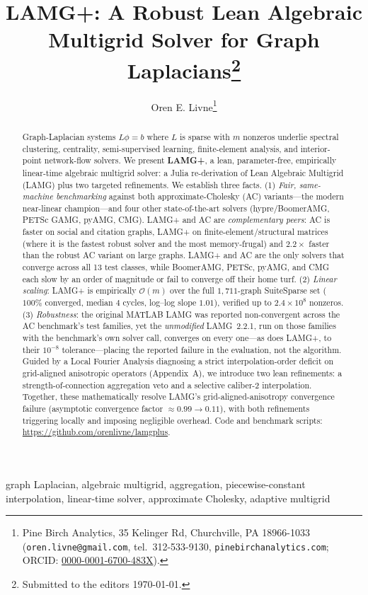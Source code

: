 \documentclass{siamart220329}
\title{LAMG+: A Robust Lean Algebraic Multigrid Solver for Graph Laplacians\thanks{Submitted to the editors \today.}}
\author{Oren E. Livne\thanks{Pine Birch Analytics, 35 Kelinger Rd, Churchville, PA 18966-1033 (\texttt{oren.livne@gmail.com}, tel.\ 312-533-9130, \texttt{pinebirchanalytics.com}; ORCID: \href{https://orcid.org/0000-0001-6700-483X}{0000-0001-6700-483X}).}}
\newcommand{\Om}{\mathcal{O}(m)}
\begin{document}
\maketitle

\begin{abstract}
Graph-Laplacian systems $L\phi=b$ where $L$ is sparse with $m$ nonzeros underlie spectral clustering, centrality, semi-supervised
learning, finite-element analysis, and interior-point network-flow solvers. We present \textbf{LAMG+},
a lean, parameter-free, empirically linear-time algebraic multigrid solver: a Julia re-derivation of
Lean Algebraic Multigrid (LAMG) plus two targeted refinements. We establish three facts. (1)
\emph{Fair, same-machine benchmarking} against both approximate-Cholesky (AC) variants---the modern
near-linear champion---and four other state-of-the-art solvers (hypre/BoomerAMG, PETSc GAMG, pyAMG,
CMG). LAMG+ and AC are \emph{complementary peers}: AC is faster on social and
citation graphs, LAMG+ on finite-element/structural matrices (where it is the fastest robust solver
and the most memory-frugal) and $2.2\times$ faster than the robust AC variant on large
graphs. LAMG+ and AC are the only solvers that converge across all 13 test classes, while BoomerAMG, PETSc, pyAMG, and CMG each slow by an order of magnitude or fail to converge off their home turf. (2)
\emph{Linear scaling}: LAMG+ is empirically $\Om$ over the full $1{,}711$-graph SuiteSparse set
($100\%$ converged, median $4$ cycles, log--log slope $1.01$), verified up to $2.4\!\times\!10^8$ nonzeros. (3)
\emph{Robustness}: the original MATLAB LAMG was reported non-convergent across the
AC benchmark's test families, yet the \emph{unmodified} LAMG~2.2.1, run on those
families with the benchmark's own solver call, converges on every one---as does LAMG+,
to their $10^{-8}$ tolerance---placing the reported failure in the evaluation, not the
algorithm. Guided by a Local Fourier Analysis diagnosing a strict interpolation-order deficit on grid-aligned anisotropic operators (Appendix~A), we introduce two lean refinements: a strength-of-connection aggregation veto and a selective caliber-2 interpolation. Together, these mathematically resolve LAMG's grid-aligned-anisotropy convergence failure (asymptotic convergence factor $\approx0.99\!\to\!0.11$), with both refinements triggering locally and imposing negligible overhead. Code and benchmark scripts: \url{https://github.com/orenlivne/lamgplus}.
\end{abstract}

\begin{keywords}
graph Laplacian, algebraic multigrid, aggregation, piecewise-constant interpolation,
linear-time solver, approximate Cholesky, adaptive multigrid
\end{keywords}
\end{document}
